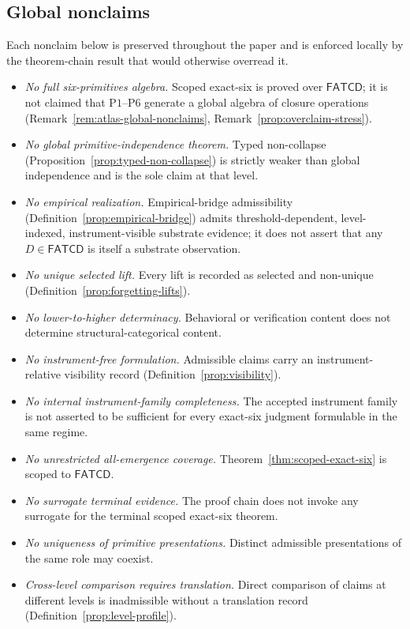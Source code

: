 \documentclass[11pt]{article}
\theoremstyle{definition}
\newcommand{\FATCD}{\ensuremath{\mathsf{FATCD}}}
\newcommand{\Pone}{\ensuremath{\mathrm{P1}}}
\newcommand{\Psix}{\ensuremath{\mathrm{P6}}}
\begin{document}
\subsection{Global nonclaims}\label{subsec:global-nonclaims}

Each nonclaim below is preserved throughout the paper and is enforced
locally by the theorem-chain result that would otherwise overread it.

\begin{itemize}[topsep=2pt,itemsep=1pt]
  \item \emph{No full six-primitives algebra.} Scoped exact-six is
    proved over \FATCD{}; it is not claimed that \Pone{}--\Psix{}
    generate a global algebra of closure operations
    (Remark~\ref{rem:atlas-global-nonclaims},
    Remark~\ref{prop:overclaim-stress}).
  \item \emph{No global primitive-independence theorem.} Typed
    non-collapse (Proposition~\ref{prop:typed-non-collapse}) is
    strictly weaker than global independence and is the sole claim at
    that level.
  \item \emph{No empirical realization.} Empirical-bridge admissibility
    (Definition~\ref{prop:empirical-bridge}) admits
    threshold-dependent, level-indexed, instrument-visible substrate
    evidence; it does not assert that any \(D \in \FATCD{}\) is itself
    a substrate observation.
  \item \emph{No unique selected lift.} Every lift is recorded as
    selected and non-unique
    (Definition~\ref{prop:forgetting-lifts}).
  \item \emph{No lower-to-higher determinacy.} Behavioral or
    verification content does not determine structural-categorical
    content.
  \item \emph{No instrument-free formulation.} Admissible claims carry
    an instrument-relative visibility record
    (Definition~\ref{prop:visibility}).
  \item \emph{No internal instrument-family completeness.} The
    accepted instrument family is not asserted to be sufficient for
    every exact-six judgment formulable in the same regime.
  \item \emph{No unrestricted all-emergence coverage.}
    Theorem~\ref{thm:scoped-exact-six} is scoped to \FATCD{}.
  \item \emph{No surrogate terminal evidence.} The proof chain does
    not invoke any surrogate for the terminal scoped exact-six
    theorem.
  \item \emph{No uniqueness of primitive presentations.} Distinct
    admissible presentations of the same role may coexist.
  \item \emph{Cross-level comparison requires translation.} Direct
    comparison of claims at different levels is inadmissible without a
    translation record (Definition~\ref{prop:level-profile}).
\end{itemize}
\end{document}
